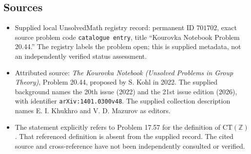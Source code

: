 \documentclass[11pt]{article}
\newcommand{\Z}{\mathbb{Z}}
\begin{document}
\subsection{Sources}
\begin{itemize}
\item Supplied local UnsolvedMath registry record: permanent ID \(701702\), exact source problem code \texttt{catalogue entry}, title ``Kourovka Notebook Problem 20.44.'' The registry labels the problem open; this is supplied metadata, not an independently verified status assessment.
\item Attributed source: \emph{The Kourovka Notebook (Unsolved Problems in Group Theory)}, Problem 20.44, proposed by S. Kohl in 2022. The supplied background names the 20th issue (2022) and the 21st issue edition (2026), with identifier \texttt{arXiv:1401.0300v48}. The supplied collection description names E. I. Khukhro and V. D. Mazurov as editors.
\item The statement explicitly refers to Problem 17.57 for the definition of \(\mathrm{CT}(\Z)\). That referenced definition is absent from the supplied record. The cited source and cross-reference have not been independently consulted or verified.
\end{itemize}
\end{document}

